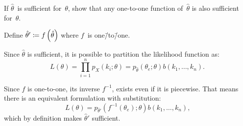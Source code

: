 \begin{problem}
   If $\hat{\theta}$~is sufficient for~$\theta$, show that any one-to-one function of~$\hat{\theta}$ is also sufficient for~$\theta$.
\end{problem}

Define ${\hat{\theta}' \coloneqq f\left(\hat{\theta}\right)}$ where $f$~is one\=/to\=/one.

Since $\hat{\theta}$ is sufficient, it is possible to partition the likelihood function as:
\begin{equation}
  L(\theta) = \prod_{i=1}^{n} p_{X}(k_i;\theta) = p_{\hat{\theta}}(\theta_e;\theta)b(k_1,\ldots,k_n)\text{.}
\end{equation}

Since $f$ is one-to-one, its inverse $f^{-1}$, exists even if it is piecewise.  That means there is an equivalent formulation with substitution:
\begin{equation}
  L(\theta) =  p_{\hat{\theta}'}(f^{-1}(\theta_e);\theta)b(k_1,\ldots,k_n)\text{,}
\end{equation}
which by definition makes $\hat{\theta}'$ sufficient.
